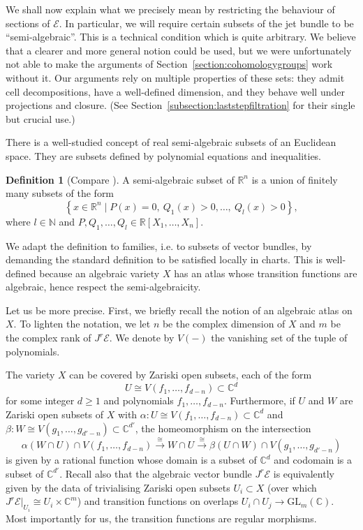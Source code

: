 \documentclass[a4paper]{amsart}
\newcommand{\bN}{\mathbb N}
\newcommand{\bR}{\mathbb R}
\newcommand{\bC}{\mathbb C}
\newcommand{\cE}{\mathcal E}
\newcommand{\lra}{\longrightarrow}
\theoremstyle{plain}
\theoremstyle{definition}
\newtheorem{definition}[theorem]{Definition}
\begin{document}
We shall now explain what we precisely mean by restricting the behaviour of sections of $\cE$. In particular, we will require certain subsets of the jet bundle to be ``semi-algebraic''. This is a technical condition which is quite arbitrary. We believe that a clearer and more general notion could be used, but we were unfortunately not able to make the arguments of Section~\ref{section:cohomologygroups} work without it. Our arguments rely on multiple properties of these sets: they admit cell decompositions, have a well-defined dimension, and they behave well under projections and closure. (See Section~\ref{subsection:laststepfiltration} for their single but crucial use.)

\bigskip

There is a well-studied concept of real semi-algebraic subsets of an Euclidean space. They are subsets defined by polynomial equations and inequalities.

\begin{definition}[Compare \cite{bochnak_real_1998}]\label{def:realsemialgebraicsubset}
A semi-algebraic subset of $\bR^n$ is a union of finitely many subsets of the form
\[
    \left\{ x\in \bR^n \mid P(x) = 0, \ Q_1(x) > 0, \ldots, \ Q_l(x) > 0 \right\},
\]
where $l \in \bN$ and $P,Q_1,\ldots,Q_l \in \bR[X_1,\ldots,X_n]$.
\end{definition}

We adapt the definition to families, i.e. to subsets of vector bundles, by demanding the standard definition to be satisfied locally in charts. This is well-defined because an algebraic variety $X$ has an atlas whose transition functions are algebraic, hence respect the semi-algebraicity.

Let us be more precise. First, we briefly recall the notion of an algebraic atlas on $X$. To lighten the notation, we let $n$ be the complex dimension of $X$ and $m$ be the complex rank of $J^r\cE$. We denote by $V(-)$ the vanishing set of the tuple of polynomials.

The variety $X$ can be covered by Zariski open subsets, each of the form
\[
    U \cong V(f_1,\ldots,f_{d-n}) \subset \bC^d
\]
for some integer $d \geq 1$ and polynomials $f_1, \ldots, f_{d-n}$. Furthermore, if $U$ and $W$ are Zariski open subsets of $X$ with $\alpha \colon U \cong V(f_1,\ldots,f_{d-n}) \subset \bC^d$ and $\beta \colon W \cong V(g_1,\ldots,g_{d'-n}) \subset \bC^{d'}$, the homeomorphism on the intersection
\[
    \alpha(W \cap U) \cap V(f_1,\ldots,f_{d-n}) \overset{\cong}{\lra} W \cap U \overset{\cong}{\lra} \beta(U \cap W) \cap V(g_1,\ldots,g_{d'-n})
\]
is given by a rational function whose domain is a subset of $\bC^d$ and codomain is a subset of $\bC^{d'}$. Recall also that the algebraic vector bundle $J^r\cE$ is equivalently given by the data of trivialising Zariski open subsets $U_i \subset X$ (over which $J^r\cE|_{U_i} \cong U_i \times \bC^m$) and transition functions on overlaps $U_i \cap U_j \to \mathrm{GL}_m(\bC)$. Most importantly for us, the transition functions are regular morphisms.
\end{document}
